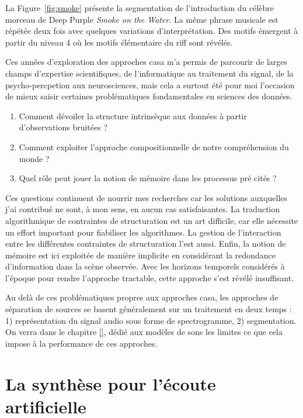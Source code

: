 La Figure~\ref{fig:smoke} présente la segmentation de l'introduction du célèbre morceau de
Deep Purple \emph{Smoke on the Water}. La même phrase musicale est répétée deux fois avec quelques variations d'interprétation. Des motifs émergent à partir du niveau 4 où les motifs élémentaire du riff sont révélés.

Ces années d'exploration des approches casa m'a permis de parcourir de larges champs d'expertise scientifiques, de l'informatique au traitement du signal, de la psycho-percpetion aux neurosciences, mais cela a surtout été pour moi l'occasion de mieux saisir certaines problématiques fondamentales en sciences des données.
\begin{enumerate}
  \item Comment dévoiler la structure intrinsèque aux données à partir d'observations bruitées ?
  \item Comment exploiter l'approche compositionnelle de notre compréhension du monde ?
  \item Quel rôle peut jouer la notion de mémoire dans les processus pré cités ?
\end{enumerate}
Ces questions continuent de nourrir mes recherches car les solutions auxquelles j'ai contribué ne sont, à mon sens, en aucun cas satisfaisantes. La traduction algorithmique de contraintes de structuration est un art difficile, car elle nécessite un effort important pour fiabiliser les algorithmes. La gestion de l'interaction entre les différentes contraintes de structuration l'est aussi. Enfin, la notion de mémoire est ici exploitée de manière implicite en considérant la redondance d'information dans la scène observée. Avec les horizons temporels considérés à l'époque pour rendre l'approche tractable, cette approche s'est révélé insuffisant.  %

Au delà de ces problématiques propres aux approches casa, les approches de séparation de sources se basent généralement sur un traitement en deux temps : 1) représentation du signal audio sous forme de spectrogramme, 2) segmentation. On verra dans le chapitre \ref{}, dédié aux modèles de sons les limites ce que cela impose à la performance de ces approches.

\section{La synthèse pour l'écoute artificielle} \label{sec:dcase}

